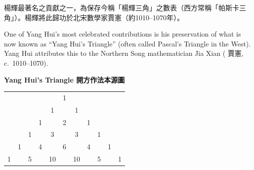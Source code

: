 \documentclass[11pt,a4paper]{article}
\newcommand{\zh}[1]{{\CJKfamily{\CJKrmdefault} #1}}
\newenvironment{chside}{%
  \begin{minipage}[t]{0.48\textwidth}%
  \setlength{\parindent}{1.5em}%
  \linespread{1.25}\selectfont%
  \small%
}{%
  \end{minipage}%
}
\newenvironment{enside}{%
  \hfill\begin{minipage}[t]{0.48\textwidth}%
  \setlength{\parindent}{1em}%
  \linespread{1.15}\selectfont%
  \small%
}{%
  \end{minipage}%
}
\begin{document}
\noindent\begin{chside}
楊輝最著名之貢獻之一，為保存今稱「楊輝三角」之數表（西方常稱「帕斯卡三角」）。楊輝將此歸功於北宋數學家賈憲（約1010--1070年）。
\end{chside}%
\begin{enside}
One of Yang Hui's most celebrated contributions is his preservation of what is
now known as ``Yang Hui's Triangle'' (often called Pascal's Triangle in the
West). Yang Hui attributes this to the Northern Song mathematician Jia Xian
(\zh{賈憲}, c.\ 1010--1070).
\end{enside}

\vspace{0.5cm}

\begin{center}
\textbf{Yang Hui's Triangle \zh{開方作法本源圖}}
\end{center}

\begin{center}
\begin{tabular}{ccccccccccc}
 & & & & & 1 & & & & & \\
 & & & & 1 & & 1 & & & & \\
 & & & 1 & & 2 & & 1 & & & \\
 & & 1 & & 3 & & 3 & & 1 & & \\
 & 1 & & 4 & & 6 & & 4 & & 1 & \\
 1 & & 5 & & 10 & & 10 & & 5 & & 1 \\
\end{tabular}
\end{center}

\vspace{0.5cm}
\end{document}
